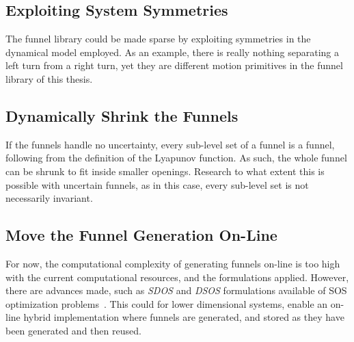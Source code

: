 \subsection{Exploiting System Symmetries}

The funnel library could be made sparse by exploiting symmetries in the
dynamical model employed. As an example, there is really nothing separating a
left turn from a right turn, yet they are different motion primitives in the
funnel library of this thesis.

\subsection{Dynamically Shrink the Funnels}

If the funnels handle no uncertainty, every sub-level set of a funnel is a
funnel, following from the definition of the Lyapunov function. As such, the whole funnel can be shrunk to fit inside smaller
openings. Research to what extent this is possible with uncertain funnels, as in
this case, every sub-level set is not necessarily invariant.

\subsection{Move the Funnel Generation On-Line}

For now, the computational complexity of generating funnels on-line is too high
with the current computational resources, and the formulations applied. However,
there are advances made, such as \textit{SDOS} and \textit{DSOS} formulations
available of \ac{SOS} optimization problems~\cite{ahmadi2014dsos}. This could
for lower dimensional systems, enable an on-line hybrid implementation where
funnels are generated, and stored as they have been generated and then reused.




